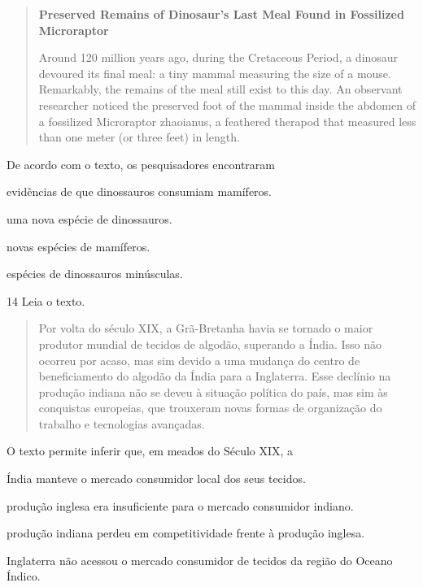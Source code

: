 \begin{quote}
\textbf{Preserved Remains of Dinosaur's Last Meal Found in Fossilized
Microraptor}

Around 120 million years ago, during the Cretaceous Period, a dinosaur
devoured its final meal: a tiny mammal measuring the size of a mouse.
Remarkably, the remains of the meal still exist to this day. An
observant researcher noticed the preserved foot of the mammal inside the
abdomen of a fossilized Microraptor zhaoianus, a feathered therapod that
measured less than one meter (or three feet) in length.

\end{quote}

De acordo com o texto, os pesquisadores encontraram

\begin{escolha}
\item evidências de que dinossauros consumiam mamíferos.

\item uma nova espécie de dinossauros.

\item novas espécies de mamíferos.

\item espécies de dinossauros minúsculas.
\end{escolha}

\num{14} Leia o texto.

\begin{quote}
Por volta do século XIX, a Grã-Bretanha havia se tornado o maior produtor mundial de tecidos de algodão, superando a Índia. Isso não ocorreu por acaso, mas sim devido a uma mudança do centro de beneficiamento do algodão da Índia para a Inglaterra. Esse declínio na produção indiana não se deveu à situação política do país, mas sim às conquistas europeias, que trouxeram novas formas de organização do trabalho e tecnologias avançadas.

\end{quote}

O texto permite inferir que, em meados do Século XIX, a

\begin{escolha}
\item  Índia manteve o mercado consumidor local dos seus tecidos.

\item  produção inglesa era insuficiente para o mercado consumidor indiano.

\item  produção indiana perdeu em competitividade frente à produção inglesa.

\item  Inglaterra não acessou o mercado consumidor de tecidos da região do Oceano Índico.
\end{escolha}


